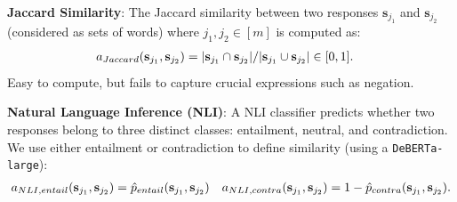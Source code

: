 \begin{block}{}



\textbf{Jaccard Similarity}:
The Jaccard similarity between two responses $\mathbf{s}_{j_1}$ and $\mathbf{s}_{j_2}$ (considered as sets of words) where $j_1,j_2\in[m]$ is computed as:
\begin{align}
    a_{Jaccard}(\mathbf{s}_{j_1}, \mathbf{s}_{j_2}) &= |\mathbf{s}_{j_1} \cap \mathbf{s}_{j_2}|/|\mathbf{s}_{j_1} \cup \mathbf{s}_{j_2}| \in [0,1].
\end{align}
Easy to compute, but fails to capture crucial expressions such as negation.

\textbf{Natural Language Inference (NLI)}:
A NLI classifier predicts whether two responses belong to three distinct classes: entailment, neutral, and contradiction. 
We use either entailment or contradiction to define similarity (using a \texttt{DeBERTa-large}):
\begin{align}
    &a_{NLI,entail}(\mathbf{s}_{j_1},\mathbf{s}_{j_2}) = \hat{p}_{entail}(\mathbf{s}_{j_1}, \mathbf{s}_{j_2})
    &a_{NLI,contra}(\mathbf{s}_{j_1},\mathbf{s}_{j_2}) = 1- \hat{p}_{contra}(\mathbf{s}_{j_1}, \mathbf{s}_{j_2}).
\end{align}

\end{block}

